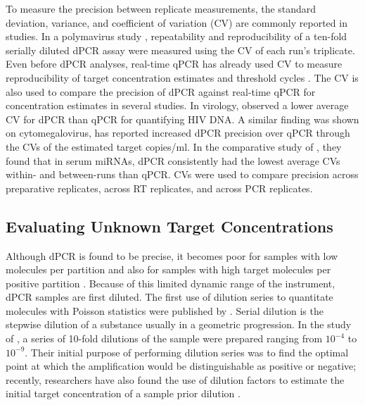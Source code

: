 To measure the precision between replicate measurements, the standard deviation, variance, and coefficient of variation (CV) are commonly reported in studies. In a polymavirus study \cite{Arvia2017}, repeatability and reproducibility of a ten-fold serially diluted dPCR assay were measured using the CV of each run's triplicate. Even before dPCR analyses, real-time qPCR has already used CV to measure reproducibility of target concentration estimates and threshold cycles \cite{Cook2009, Lai2003}. The CV is also used to compare the precision of dPCR against real-time qPCR for concentration estimates in several studies. In virology,  observed a lower average CV for dPCR than qPCR for quantifying HIV DNA. A similar finding was shown on cytomegalovirus,  has reported increased dPCR precision over qPCR through the CVs of the estimated target copies/ml. In the comparative study of , they found that in serum miRNAs, dPCR consistently had the lowest average CVs within- and between-runs than qPCR. CVs were used to compare precision across preparative replicates, across RT replicates, and across PCR replicates.

\subsection{Evaluating Unknown Target Concentrations}
\label{sec:ch2_perfeval_essentialMetrics}
Although dPCR is found to be precise, it becomes poor for samples with low molecules per partition and also for samples with high target molecules per positive partition \cite{Huggett2013_MIQEGuidelines}. Because of this limited dynamic range of the instrument, dPCR samples are first diluted. The first use of dilution series to quantitate molecules with Poisson statistics were published by . Serial dilution is the stepwise dilution of a substance usually in a geometric progression. In the study of , a series of 10-fold dilutions of the sample were prepared ranging from \(10^{-4}\) to \(10^{-9}\). Their initial purpose of performing dilution series was to find the optimal point at which the amplification would be distinguishable as positive or negative; recently, researchers have also found the use of dilution factors to estimate the initial target concentration of a sample prior dilution \cite{Gou2018, Zhu2017}. 

